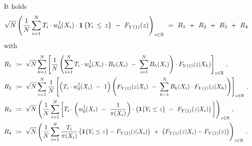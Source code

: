 \begin{lemma}
  \label{aa:mean:lemma_decomp}
  It holds
  \begin{gather}
    \sqrt{N}
    \left( 
  \frac{1}{N}
    \sum_{i=1}^{N} 
    T_i
    \cdot
    w_0^\dagger(X_i)
    \cdot
    \mathbf{1}
    \left\{ Y_i\,\le\, z \right\}
    \ 
    -
    \ 
    F_{Y(1)}(z)
    \right)
    _{z\in\R}
    \ 
    =
    \ 
    R_1
    \ 
    +
    \ 
    R_2
    \ 
    +
    \ 
    R_3
    \ 
    +
    \ 
    R_4
  \end{gather}
  with
\begin{align*}
  R_1
  &
  \ 
  :=
  \ 
  \sqrt{N}
  \sum_{k=1}^{N} 
  \left[ 
  \frac{1}{N}
  \left( 
    \sum_{i=1}^{N} 
    T_i
    \cdot
    w_0^\dagger(X_i)
    \cdot
    B_k(X_i)
    \ 
    -
    \ 
    \sum_{i=1}^{N} 
    B_k(X_i)
  \right)
  \cdot
  F_{Y(1)}(z|X_k)
  \right]
  _{z\in\R}
  \,,
  \\
  R_2
  &
  \
  :=
  \ 
  \sqrt{N}
    \sum_{i=1}^{N} 
    \frac{1}{N}
    \left[ 
      \left( 
    T_i\cdot w_0^\dagger(X_i) 
    \ 
    -
    \ 
    1 
      \right)
    \left( 
  F_{Y(1)}(z|X_i)
    \ 
    -
    \ 
    \sum_{k=1}^{N} 
    B_k(X_i)
    \cdot
  F_{Y(1)}(z|X_k)
    \right)
    \right]
  _{z\in\R}
  \,,
  \\
  R_3
  &
  \
  :=
  \ 
  \sqrt{N}
  \left( 
  \frac{1}{N}
    \sum_{i=1}^{N} 
    \left[ 
    T_i
    \cdot
    \left( 
    w^\dagger_0(X_i) 
    \ 
    -
    \ 
    \frac{1}{\pi(X_i)}
    \right)
    \cdot
    \left( 
    \mathbf{1}{\left\{ Y_i \le z \right\}}
    \ 
    -
    \ 
  F_{Y(1)}(z|X_i)
    \right)
    \,
    \right]
  \right)
  _{z\in\R}
  \,,
  \\
  R_4
  &
  \
  :=
  \ 
  \sqrt{N}
  \left( 
  \frac{1}{N}
    \sum_{i=1}^{N} 
    \frac{T_i}{\pi(X_i)}
    \left( 
    \mathbf{1}{\left\{ Y_i \le z \right\}}
    -
  F_{Y(1)}(z|X_i)
    \right)
    \ 
    +
    \ 
    \left( 
  F_{Y(1)}(z|X_i)
    -
  F_{Y(1)}(z)
    \right)
  \right)
  _{z\in\R}
  \,.
  \end{align*}
\end{lemma}
